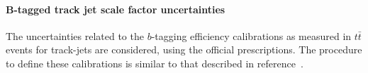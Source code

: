 




\paragraph{B-tagged track jet scale factor uncertainties}
\label{sec:b-tagging-unc}

The uncertainties related to the $b$-tagging efficiency calibrations as measured in $t\bar{t}$ events for track-jets are considered, using the official prescriptions. The procedure to define these calibrations is similar to that described in reference~\cite{Aad:2015ydr}.

